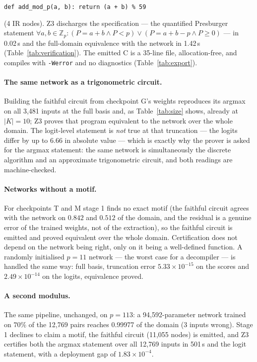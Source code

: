 \documentclass[11pt]{article}
\newcommand{\Zp}{\mathbb{Z}_p}
\newcommand{\code}[1]{\texttt{#1}}
\begin{document}
\begin{center}
\code{def add\_mod\_p(a, b): return (a + b) \% 59}
\end{center}

(4 IR nodes). Z3 discharges the specification --- the quantified Presburger statement $\forall a,b\in\Zp: (P=a+b \wedge P<p) \vee (P=a+b-p \wedge P\ge 0)$ --- in 0.02\,s and the full-domain equivalence with the network in 1.42\,s (Table~\ref{tab:verification}). The emitted C is a 35-line file, allocation-free, and compiles with \code{-Werror} and no diagnostics (Table~\ref{tab:export}).

\paragraph{The same network as a trigonometric circuit.} Building the faithful circuit from checkpoint G's weights reproduces its argmax on all 3,481 inputs at the full basis and, as Table~\ref{tab:size} shows, already at $|K|=10$; Z3 proves that program equivalent to the network over the whole domain. The logit-level statement is \emph{not} true at that truncation --- the logits differ by up to 6.66 in absolute value --- which is exactly why the prover is asked for the argmax statement: the same network is simultaneously the discrete algorithm and an approximate trigonometric circuit, and both readings are machine-checked.

\paragraph{Networks without a motif.} For checkpoints T and M stage 1 finds no exact motif (the faithful circuit agrees with the network on $0.842$ and $0.512$ of the domain, and the residual is a genuine error of the trained weights, not of the extraction), so the faithful circuit is emitted and proved equivalent over the whole domain. Certification does not depend on the network being right, only on it being a well-defined function. A randomly initialised $p=11$ network --- the worst case for a decompiler --- is handled the same way: full basis, truncation error $5.33\times10^{-15}$ on the scores and $2.49\times10^{-14}$ on the logits, equivalence proved.

\paragraph{A second modulus.} The same pipeline, unchanged, on $p=113$: a 94,592-parameter network trained on $70\%$ of the 12,769 pairs reaches 0.99977 of the domain (3 inputs wrong). Stage 1 declines to claim a motif, the faithful circuit (11,055 nodes) is emitted, and Z3 certifies both the argmax statement over all 12,769 inputs in 501\,s and the logit statement, with a deployment gap of $1.83\times10^{-4}$.
\end{document}
